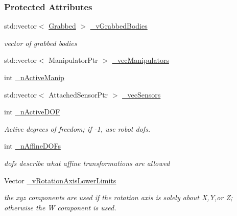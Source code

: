 \subsubsection*{Protected Attributes}
\begin{DoxyCompactItemize}
\item 
\hypertarget{classOpenRAVE_1_1RobotBase_a05dfd2aea199106122f1491d7cbd70eb}{
std::vector$<$ \hyperlink{classOpenRAVE_1_1RobotBase_1_1Grabbed}{Grabbed} $>$ \hyperlink{classOpenRAVE_1_1RobotBase_a05dfd2aea199106122f1491d7cbd70eb}{\_\-vGrabbedBodies}}
\label{classOpenRAVE_1_1RobotBase_a05dfd2aea199106122f1491d7cbd70eb}

\begin{DoxyCompactList}\small\item\em vector of grabbed bodies \item\end{DoxyCompactList}\item 
std::vector$<$ ManipulatorPtr $>$ \hyperlink{classOpenRAVE_1_1RobotBase_affad71c6cc8ac660314a5e10e4caae34}{\_\-vecManipulators}
\item 
int \hyperlink{classOpenRAVE_1_1RobotBase_aa111f44aea6f2b407af5ed096cd48edb}{\_\-nActiveManip}
\item 
std::vector$<$ AttachedSensorPtr $>$ \hyperlink{classOpenRAVE_1_1RobotBase_aac98310b73ec888db282a3ca58db245a}{\_\-vecSensors}
\item 
\hypertarget{classOpenRAVE_1_1RobotBase_a56f7252f6901d68bd1d637800120ea24}{
int \hyperlink{classOpenRAVE_1_1RobotBase_a56f7252f6901d68bd1d637800120ea24}{\_\-nActiveDOF}}
\label{classOpenRAVE_1_1RobotBase_a56f7252f6901d68bd1d637800120ea24}

\begin{DoxyCompactList}\small\item\em Active degrees of freedom; if -\/1, use robot dofs. \item\end{DoxyCompactList}\item 
\hypertarget{classOpenRAVE_1_1RobotBase_a335c90fceb6b2b3efd23f357b9071ff2}{
int \hyperlink{classOpenRAVE_1_1RobotBase_a335c90fceb6b2b3efd23f357b9071ff2}{\_\-nAffineDOFs}}
\label{classOpenRAVE_1_1RobotBase_a335c90fceb6b2b3efd23f357b9071ff2}

\begin{DoxyCompactList}\small\item\em dofs describe what affine transformations are allowed \item\end{DoxyCompactList}\item 
\hypertarget{classOpenRAVE_1_1RobotBase_aa2c84fbfca1619fcd03a3085432c7489}{
Vector \hyperlink{classOpenRAVE_1_1RobotBase_aa2c84fbfca1619fcd03a3085432c7489}{\_\-vRotationAxisLowerLimits}}
\label{classOpenRAVE_1_1RobotBase_aa2c84fbfca1619fcd03a3085432c7489}

\begin{DoxyCompactList}\small\item\em the xyz components are used if the rotation axis is solely about X,Y,or Z; otherwise the W component is used. \item\end{DoxyCompactList}\end{DoxyCompactItemize}
